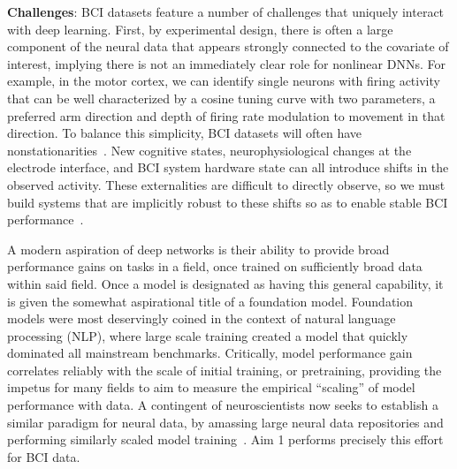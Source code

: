 \documentclass[12pt,oneside]{report}
\begin{document}
\textbf{Challenges}: BCI datasets feature a number of challenges that uniquely interact with deep learning. First, by experimental design, there is often a large component of the neural data that appears strongly connected to the covariate of interest, implying there is not an immediately clear role for nonlinear DNNs. For example, in the motor cortex, we can identify single neurons with firing activity that can be well characterized by a cosine tuning curve with two parameters, a preferred arm direction and depth of firing rate modulation to movement in that direction. To balance this simplicity, BCI datasets will often have nonstationarities~\citep{downey_18_stability,wimalasena2020unstable,perge2013intra}. New cognitive states, neurophysiological changes at the electrode interface, and BCI system hardware state can all introduce shifts in the observed activity. These externalities are difficult to directly observe, so we must build systems that are implicitly robust to these shifts so as to enable stable BCI performance~\citep{sussillo_16_future}.

A modern aspiration of deep networks is their ability to provide broad performance gains on tasks in a field, once trained on sufficiently broad data within said field. Once a model is designated as having this general capability, it is given the somewhat aspirational title of a foundation model. Foundation models were most deservingly coined in the context of natural language processing (NLP), where large scale training created a model that quickly dominated all mainstream benchmarks. Critically, model performance gain correlates reliably with the scale of initial training, or pretraining, providing the impetus for many fields to aim to measure the empirical “scaling” of model performance with data. A contingent of neuroscientists now seeks to establish a similar paradigm for neural data, by amassing large neural data repositories and performing similarly scaled model training~\citep{dyerSOMETHING}. Aim 1 performs precisely this effort for BCI data.
\end{document}
